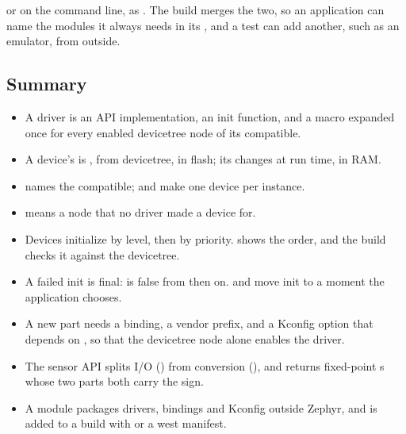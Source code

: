 \noindent or on the command line, as . The build merges the two,
so an application can name the modules it always needs in its , and a test can
add another, such as an emulator, from outside.

\subsection{Summary}
\begin{itemize}
  \item A driver is an API implementation, an init function, and a macro expanded once for every enabled
    devicetree node of its compatible.
  \item A device’s  is , from devicetree, in flash; its  changes at run
    time, in RAM.
  \item {} names the compatible;  and
     make one device per instance.
  \item {} means a node that no driver made a device for.
  \item Devices initialize by level, then by priority.  shows the order, and
    the build checks it against the devicetree.
  \item A failed init is final:  is false from then on. 
    and  move init to a moment the application chooses.
  \item A new part needs a binding, a vendor prefix, and a Kconfig option that depends on
    , so that the devicetree node alone enables the driver.
  \item The sensor API splits I/O () from conversion (), and returns
    fixed-point s whose two parts both carry the sign.
  \item A module packages drivers, bindings and Kconfig outside Zephyr, and is added to a build with
     or a west manifest.
\end{itemize}
